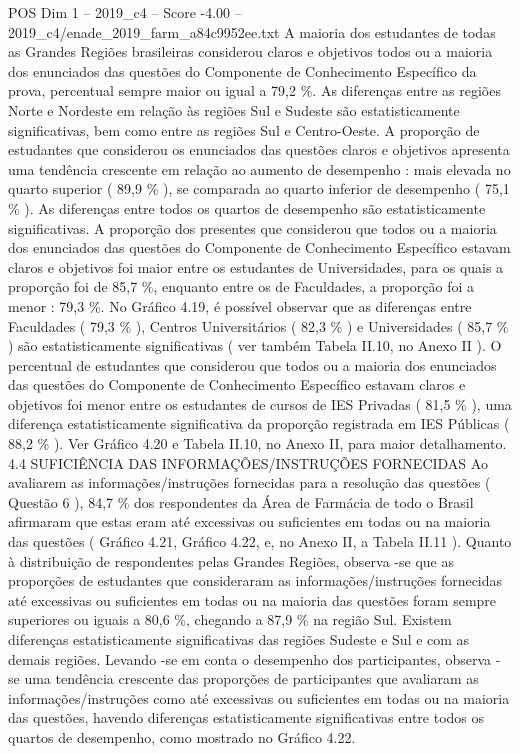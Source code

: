 \begin{textsample}{POS Dim 1 – 2019\_c4 – Score -4.00 – 2019\_c4/enade\_2019\_farm\_a84c9952ee.txt}
A maioria dos estudantes de todas as Grandes Regiões brasileiras considerou claros e objetivos todos ou a maioria dos enunciados das questões do Componente de Conhecimento Específico da prova, percentual sempre maior ou igual a 79,2 \%.
As diferenças entre as regiões Norte e Nordeste em relação às regiões Sul e Sudeste são estatisticamente significativas, bem como entre as regiões Sul e Centro-Oeste.
A proporção de estudantes que considerou os enunciados das questões claros e objetivos apresenta uma tendência crescente em relação ao aumento de desempenho : mais elevada no quarto superior ( 89,9 \% ), se comparada ao quarto inferior de desempenho ( 75,1 \% ).
As diferenças entre todos os quartos de desempenho são estatisticamente significativas.
A proporção dos presentes que considerou que todos ou a maioria dos enunciados das questões do Componente de Conhecimento Específico estavam claros e objetivos foi maior entre os estudantes de Universidades, para os quais a proporção foi de 85,7 \%, enquanto entre os de Faculdades, a proporção foi a menor : 79,3 \%.
No Gráfico 4.19, é possível observar que as diferenças entre Faculdades ( 79,3 \% ), Centros Universitários ( 82,3 \% ) e Universidades ( 85,7 \% ) são estatisticamente significativas ( ver também Tabela II.10, no Anexo II ).
O percentual de estudantes que considerou que todos ou a maioria dos enunciados das questões do Componente de Conhecimento Específico estavam claros e objetivos foi menor entre os estudantes de cursos de IES Privadas ( 81,5 \% ), uma diferença estatisticamente significativa da proporção registrada em IES Públicas ( 88,2 \% ).
Ver Gráfico 4.20 e Tabela II.10, no Anexo II, para maior detalhamento. 4.4 SUFICIÊNCIA DAS INFORMAÇÕES/INSTRUÇÕES FORNECIDAS Ao avaliarem as informações/instruções fornecidas para a resolução das questões ( Questão 6 ), 84,7 \% dos respondentes da Área de Farmácia de todo o Brasil afirmaram que estas eram até excessivas ou suficientes em todas ou na maioria das questões ( Gráfico 4.21, Gráfico 4.22, e, no Anexo II, a Tabela II.11 ).
Quanto à distribuição de respondentes pelas Grandes Regiões, observa -se que as proporções de estudantes que consideraram as informações/instruções fornecidas até excessivas ou suficientes em todas ou na maioria das questões foram sempre superiores ou iguais a 80,6 \%, chegando a 87,9 \% na região Sul.
Existem diferenças estatisticamente significativas das regiões Sudeste e Sul e com as demais regiões.
Levando -se em conta o desempenho dos participantes, observa -se uma tendência crescente das proporções de participantes que avaliaram as informações/instruções como até excessivas ou suficientes em todas ou na maioria das questões, havendo diferenças estatisticamente significativas entre todos os quartos de desempenho, como mostrado no Gráfico 4.22.

\end{textsample}
